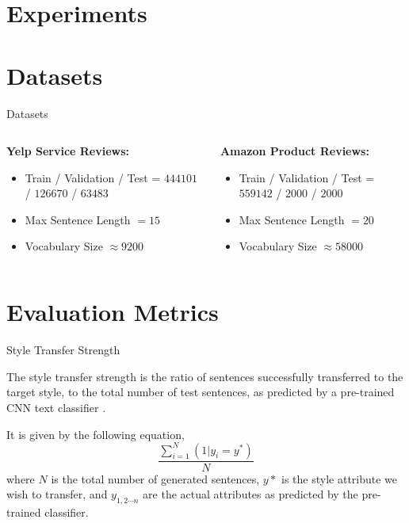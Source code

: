 \documentclass[aspectratio=169]{beamer}
\begin{document}
% 

\section{Experiments}

\section{Datasets}

\begin{frame}{Datasets}
	\begin{columns}[T] %
		\begin{column}{.48\textwidth}
			\Large
			\textbf{Yelp Service Reviews:}

			\citep{shen2017style}
			\begin{itemize}
				\item Train / Validation / Test = $444101$ / $126670$ / $63483$
				\item Max Sentence Length $= 15$
				\item Vocabulary Size $\approx 9200$
			\end{itemize}
		\end{column}
		\hfill
		\begin{column}{.48\textwidth}
			\Large
			\textbf{Amazon Product Reviews:}

			\citep{fu2017style}
			\begin{itemize}
				\item Train / Validation / Test = $559142$ / $2000$ / $2000$
				\item Max Sentence Length $= 20$
				\item Vocabulary Size $\approx 58000$
			\end{itemize}
		\end{column}
	\end{columns}

\end{frame}

\section{Evaluation Metrics}

\begin{frame}{Style Transfer Strength}

	The style transfer strength is the ratio of sentences successfully transferred to the target style, to the total number of test sentences, as predicted by a pre-trained CNN text classifier \citep{kim2014convolutional}.

	It is given by the following equation,
	\begin{equation*}
		\frac{\sum_{i=1}^{N}{(1 | y_i = y^*)}}{N}
	\end{equation*}
	where $N$ is the total number of generated sentences, $y*$ is the style attribute we wish to transfer, and $y_{1, 2 \cdots n}$ are the actual attributes as predicted by the pre-trained classifier.
\end{frame}
\end{document}

